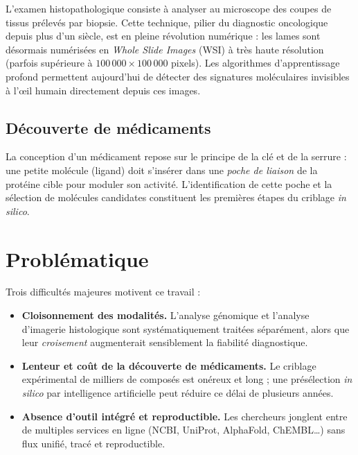 \documentclass[12pt,a4paper,oneside]{book}
\begin{document}
L'examen histopathologique consiste à analyser au microscope des coupes de
tissus prélevés par biopsie. Cette technique, pilier du diagnostic oncologique
depuis plus d'un siècle, est en pleine révolution numérique : les lames sont
désormais numérisées en \textit{Whole Slide Images} (WSI) à très haute
résolution (parfois supérieure à $100\,000 \times 100\,000$ pixels). Les
algorithmes d'apprentissage profond permettent aujourd'hui de détecter des
signatures moléculaires invisibles à l'œil humain directement depuis ces
images.

\subsection{Découverte de médicaments}

La conception d'un médicament repose sur le principe de la \og clé et de la
serrure\fg{} : une petite molécule (ligand) doit s'insérer dans une
\emph{poche de liaison} de la protéine cible pour moduler son activité.
L'identification de cette poche et la sélection de molécules candidates
constituent les premières étapes du criblage \textit{in silico}.

\section{Problématique}

Trois difficultés majeures motivent ce travail :

\begin{itemize}
  \item \textbf{Cloisonnement des modalités.} L'analyse génomique et
    l'analyse d'imagerie histologique sont systématiquement traitées
    séparément, alors que leur \emph{croisement} augmenterait sensiblement la
    fiabilité diagnostique.
  \item \textbf{Lenteur et coût de la découverte de médicaments.} Le criblage
    expérimental de milliers de composés est onéreux et long ; une
    présélection \textit{in silico} par intelligence artificielle peut
    réduire ce délai de plusieurs années.
  \item \textbf{Absence d'outil intégré et reproductible.} Les chercheurs
    jonglent entre de multiples services en ligne (NCBI, UniProt, AlphaFold,
    ChEMBL\ldots) sans flux unifié, tracé et reproductible.
\end{itemize}

\end{document}
